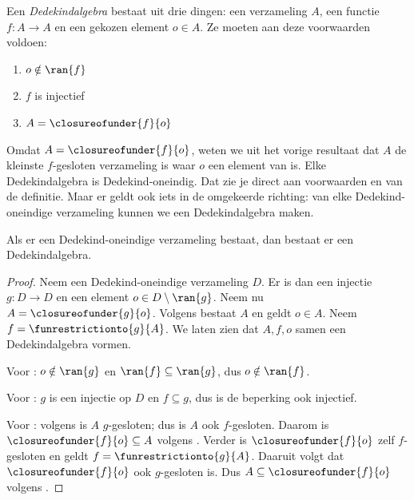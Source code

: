 \documentclass[openany]{memoir}
\begin{document}
\begin{defn}
Een \emph{Dedekindalgebra} bestaat uit drie dingen: een verzameling
$A$, een functie $f \colon A \to A$ en een gekozen element $o \in A$.
Ze moeten aan deze voorwaarden voldoen:
	\begin{enumerate}
		\item {} $o \notin \ran{f}$
		\item {} $f$ is injectief
		\item {} $A = \closureofunder{f}{o}$
	\end{enumerate}
\end{defn}

Omdat $A = \closureofunder{f}{o}$, weten we uit het vorige resultaat
dat $A$ de kleinste $f$-gesloten verzameling is waar $o$ een element
van is. Elke Dedekindalgebra is Dedekind-oneindig. Dat zie je direct aan
voorwaarden  en  van de
definitie. Maar er geldt ook iets in de omgekeerde richting: van elke
Dedekind-oneindige verzameling kunnen we een Dedekindalgebra maken.

\begin{thm}
Als er een Dedekind-oneindige verzameling bestaat, dan bestaat er een
Dedekindalgebra.
\end{thm}

\begin{proof}
Neem een Dedekind-oneindige verzameling $D$. Er is dan een injectie $g
\colon D \to D$ en een element $o \in D \setminus \ran{g}$. Neem nu
$A = \closureofunder{g}{o}$. Volgens  bestaat
$A$ en geldt $o \in A$. Neem $f = \funrestrictionto{g}{A}$. We laten
zien dat $A, f, o$ samen een Dedekindalgebra vormen.

Voor : $o \notin \ran{g}$ en $\ran{f} \subseteq
\ran{g}$, dus $o\notin \ran{f}$.

Voor : $g$ is een injectie op $D$ en $f
\subseteq g$, dus is de beperking ook injectief.

Voor : volgens  is $A$
$g$-gesloten; dus is $A$ ook $f$-gesloten. Daarom is
$\closureofunder{f}{o} \subseteq A$ volgens
. Verder is $\closureofunder{f}{o}$ zelf
$f$-gesloten en geldt $f = \funrestrictionto{g}{A}$. Daaruit volgt dat
$\closureofunder{f}{o}$ ook $g$-gesloten is. Dus
$A \subseteq \closureofunder{f}{o}$ volgens
.
\end{proof}
\endgroup
\end{document}
